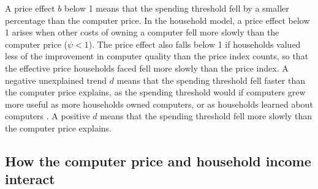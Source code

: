 \documentclass[11pt]{article}
\begin{document}
A price effect $b$ below 1 means that the spending threshold fell by a smaller percentage than the computer price. In the household model, a price effect below 1 arises when other costs of owning a computer fell more slowly than the computer price ($\psi < 1$). The price effect also falls below 1 if households valued less of the improvement in computer quality than the price index counts, so that the effective price households faced fell more slowly than the price index. A negative unexplained trend $d$ means that the spending threshold fell faster than the computer price explains, as the spending threshold would if computers grew more useful as more households owned computers, or as households learned about computers \citep{goolsbee2002}. A positive $d$ means that the spending threshold fell more slowly than the computer price explains.

\subsection{How the computer price and household income interact}
\end{document}
